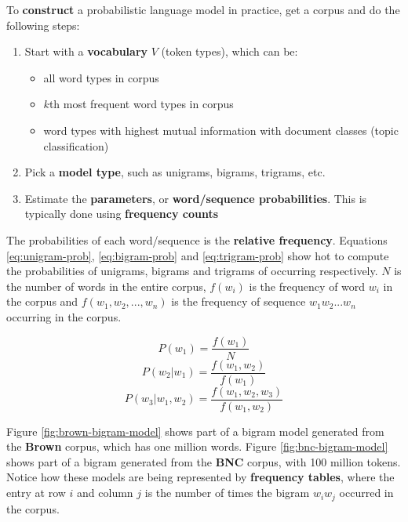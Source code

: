 \documentclass{article}
\begin{document}
To \textbf{construct} a probabilistic language model in practice, get a corpus and do the following steps:
\begin{enumerate}
	\item Start with a \textbf{vocabulary} $V$ (token types), which can be:
	\begin{itemize}
		\item all word types in corpus
		\item $k$th most frequent word types in corpus
		\item word types with highest mutual information with document classes (topic classification)
	\end{itemize}
	\item Pick a \textbf{model type}, such as unigrams, bigrams, trigrams, etc.
	\item Estimate the \textbf{parameters}, or \textbf{word/sequence probabilities}. This is typically done using \textbf{frequency counts}
\end{enumerate}

The probabilities of each word/sequence is the \textbf{relative frequency}. Equations \ref{eq:unigram-prob}, \ref{eq:bigram-prob} and \ref{eq:trigram-prob} show hot to compute the probabilities of unigrams, bigrams and trigrams of occurring respectively. $N$ is the number of words in the entire corpus, $f(w_i)$ is the frequency of word $w_i$ in the corpus and $f(w_1, w_2, ..., w_n)$ is the frequency of sequence $w_1w_2...w_n$ occurring in the corpus.

\begin{equation}
	P(w_1) = \frac{f(w_1)}{N}
	\label{eq:unigram-prob}
\end{equation}
\begin{equation}
	P(w_2|w_1) = \frac{f(w_1, w_2)}{f(w_1)}
	\label{eq:bigram-prob}
\end{equation}
\begin{equation}
	P(w_3|w_1,w_2) = \frac{f(w_1, w_2, w_3)}{f(w_1, w_2)}
	\label{eq:trigram-prob}
\end{equation}

Figure \ref{fig:brown-bigram-model} shows part of a bigram model generated from the \textbf{Brown} corpus, which has one million words. Figure \ref{fig:bnc-bigram-model} shows part of a bigram generated from the \textbf{BNC} corpus, with 100 million tokens. Notice how these models are being represented by \textbf{frequency tables}, where the entry at row $i$ and column $j$ is the number of times the bigram $w_i w_j$ occurred in the corpus.
\end{document}
